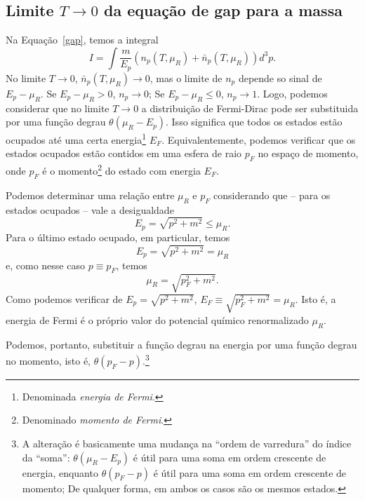\subsection{Limite $T \to 0$ da equação de gap para a massa}

Na Equação~\eqref{gap}, temos a integral
\begin{equation}
	I = \int \frac{m}{E_p} (n_p(T, \mu_R) + \bar{n}_p(T, \mu_R)) d^3p.
\end{equation}
%
No limite $T \to 0$, $\bar{n}_p(T, \mu_R) \to 0$, mas o limite de $n_p$ depende so sinal de $E_p - \mu_R$. Se $E_p - \mu_R > 0$, $n_p \to 0$; Se $E_p - \mu_R \leqslant 0$, $n_p \to 1$. Logo, podemos considerar que no limite $T \to 0$ a distribuição de Fermi-Dirac pode ser substituida por uma função degrau $\theta(\mu_R - E_p)$. Isso significa que todos os estados estão ocupados até uma certa energia\footnote{Denominada \emph{energia de Fermi}.} $E_F$. Equivalentemente, podemos verificar que os estados ocupados estão contidos em uma esfera de raio $p_F$ no espaço de momento, onde $p_F$ é o momento\footnote{Denominado \emph{momento de Fermi}.} do estado com energia $E_F$. 

Podemos determinar uma relação entre $\mu_R$ e $p_F$ considerando que -- para os estados ocupados -- vale a desigualdade
\begin{equation}
	E_p = \sqrt{p^2 + m^2} \leqslant \mu_R.
\end{equation}
%
Para o último estado ocupado, em particular, temos
\begin{equation}
	E_p = \sqrt{p^2 + m^2} = \mu_R
\end{equation}
%
e, como nesse caso $p \equiv p_F$, temos
\begin{equation}
	\mu_R = \sqrt{p_F^2 + m^2}.
\end{equation}
%
Como podemos verificar de $E_p = \sqrt{p^2 + m^2}$, $E_F \equiv \sqrt{p_F^2 + m^2} = \mu_R$. Isto é, a energia de Fermi é o próprio valor do potencial químico renormalizado $\mu_R$.

Podemos, portanto, substituir a função degrau na energia por uma função degrau no momento, isto é, $\theta(p_F - p)$.\footnote{A alteração é basicamente uma mudança na ``ordem de varredura'' do índice da ``soma'': $\theta(\mu_R - E_p)$ é útil para uma soma em ordem crescente de energia, enquanto $\theta(p_F - p)$ é útil para uma soma em ordem crescente de momento; De qualquer forma, em ambos os casos são os mesmos estados.}

